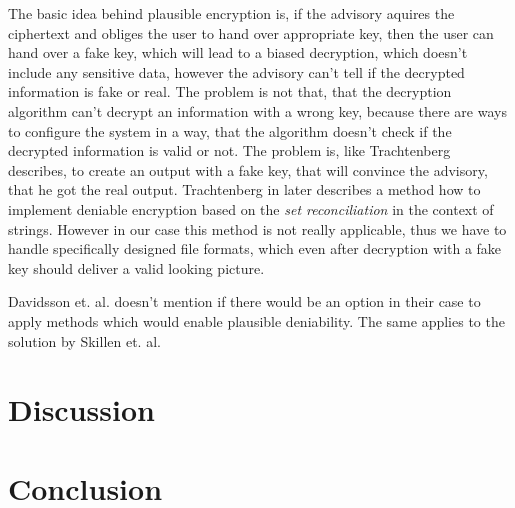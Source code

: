 \documentclass[12pt,a4paper,titlepage,oneside]{scrartcl}
\begin{document}
The basic idea behind plausible encryption is, if the advisory aquires the ciphertext and obliges the user to hand over appropriate key, then the user can hand over a fake key, which will lead to a biased decryption, which doesn't include any sensitive data, however the advisory can't tell if the decrypted information is fake or real. \cite{canetti1997deniable}
The problem is not that, that the decryption algorithm can't decrypt an information with a wrong key, because there are ways to configure the system in a way, that the algorithm doesn't check if the decrypted information is valid or not.
The problem is, like Trachtenberg describes, to create an output with a fake key, that will convince the advisory, that he got the real output. \cite{trachtenbergsay}
Trachtenberg in \cite{trachtenbergsay} later describes a method how to implement deniable encryption based on the \textit{set reconciliation} in the context of strings.
However in our case this method is not really applicable, thus we have to handle specifically designed file formats, which even after decryption with a fake key should deliver a valid looking picture.

Davidsson et. al. doesn't mention if there would be an option in their case to apply methods which would enable plausible deniability.
The same applies to the solution by Skillen et. al.
\newpage
\section{Discussion}
\newpage
\section{Conclusion}
\newpage




\end{document}
